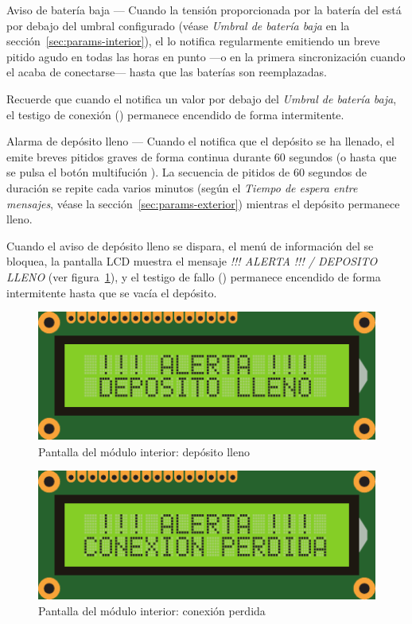 \begin{descriptioncompact}

\item[Aviso de batería baja] --- Cuando la tensión proporcionada por la batería del \MEE está por debajo del umbral configurado (véase \emph{Umbral de batería baja} en la sección~\ref{sec:params-interior}), el \MIE lo notifica regularmente emitiendo un breve pitido agudo en todas las horas en punto ---o en la primera sincronización cuando el \CMS acaba de conectarse--- hasta que las baterías son reemplazadas.

Recuerde que cuando el \ME notifica un valor por debajo del \emph{Umbral de batería baja}, el testigo de conexión  () permanece encendido de forma intermitente.


\item[Alarma de depósito lleno] --- Cuando el \MEE notifica que el depósito se ha llenado, el \MIE emite breves pitidos graves de forma continua durante 60 segundos (o hasta que se pulsa el botón multifución ).
La secuencia de pitidos de 60 segundos de duración se repite cada varios minutos (según el \emph{Tiempo de espera entre mensajes}, véase la sección~\ref{sec:params-exterior}) mientras el depósito permanece lleno.

Cuando el aviso de depósito lleno se dispara, el menú de información del \MIE se bloquea, la pantalla LCD  muestra el mensaje \emph{!!! ALERTA !!! / DEPO\-SITO LLENO} (ver figura~\ref{fig:screen-deposit-full}), y el testigo de fallo  () permanece encendido de forma intermitente hasta que se vacía el depósito. 

\begin{figure}
  \centering
  \includegraphics[width=0.6\columnwidth]{images/screen-deposit-full}
  \caption{Pantalla del módulo interior: depósito lleno}
  \label{fig:screen-deposit-full}
\end{figure}

\begin{figure}
  \centering
  \includegraphics[width=0.6\columnwidth]{images/screen-conn-lost}
  \caption{Pantalla del módulo interior: conexión perdida}
  \label{fig:screen-conn-lost}
\end{figure}


\end{descriptioncompact}
